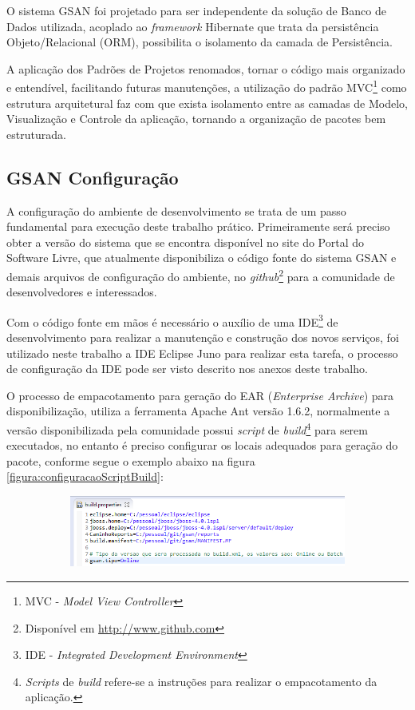 O sistema GSAN foi projetado para ser independente da solução de Banco de Dados utilizada, acoplado ao \textit{framework} Hibernate que trata da persistência Objeto/Relacional (ORM), possibilita o isolamento da camada de Persistência.

A aplicação dos Padrões de Projetos renomados, tornar o código mais organizado e entendível, facilitando futuras manutenções, a utilização do padrão MVC\footnote{MVC - \textit{Model View Controller}} como estrutura arquitetural faz com que exista isolamento entre as camadas de Modelo, Visualização e Controle da aplicação, tornando a organização de pacotes bem estruturada.
	
	
\subsection{GSAN Configuração}
A configuração do ambiente de desenvolvimento se trata de um passo fundamental para execução deste trabalho prático. Primeiramente será preciso obter a versão do sistema que se encontra disponível no site do Portal do Software Livre, que atualmente disponibiliza o código fonte do sistema GSAN e demais arquivos de configuração do ambiente, no \textit{github}\footnote{Disponível em \url{http://www.github.com}} para a comunidade de desenvolvedores e interessados. 

Com o código fonte em mãos é necessário o auxílio de uma IDE\footnote{IDE - \textit{Integrated Development Environment}} de desenvolvimento para realizar a manutenção e construção dos novos serviços, foi utilizado neste trabalho a IDE Eclipse Juno para realizar esta tarefa, o processo de configuração da IDE pode ser visto descrito nos anexos deste trabalho.

O processo de empacotamento para geração do EAR (\textit{Enterprise Archive}) para disponibilização, utiliza a ferramenta Apache Ant versão 1.6.2, normalmente a versão disponibilizada pela comunidade possui \textit{script} de \textit{build}\footnote{\textit{Scripts} de \textit{build} refere-se a instruções para realizar o empacotamento da aplicação.} para serem executados, no entanto é preciso configurar os locais adequados para geração do pacote, conforme segue o exemplo abaixo na figura \ref{figura:configuracaoScriptBuild}:

\begin{figure}[H]
	\centering
	\caption{Exemplo de configuração do \textit{script} build}
	\label{figura:configuracaoScriptBuild}	
	\begin{subfigure}[H]{\textwidth}
		\centering
		\includegraphics{figuras/build_properties.png}
	\end{subfigure}
\end{figure}
	
